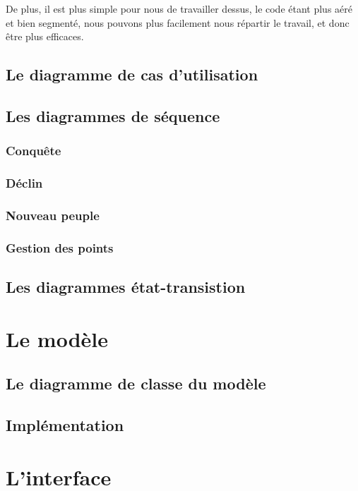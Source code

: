\documentclass[11pt]{report}
\begin{document}
			De plus, il est plus simple pour nous de travailler dessus, le code étant plus aéré et bien segmenté, nous pouvons plus facilement nous répartir le travail, et donc être plus efficaces. 

	\section{Le diagramme de cas d'utilisation}

	\section{Les diagrammes de séquence}

		\subsection{Conquête}

		\subsection{Déclin}

		\subsection{Nouveau peuple}

		\subsection{Gestion des points}

	\section{Les diagrammes état-transistion}

\chapter{Le modèle}

	\section{Le diagramme de classe du modèle}

	\section{Implémentation}

\chapter{L'interface}
\end{document}
